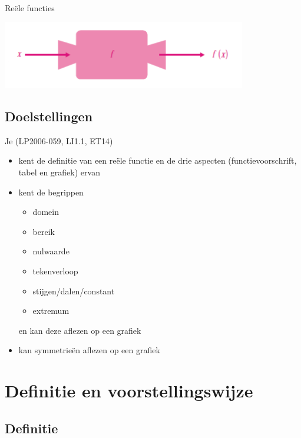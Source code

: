 \documentclass[12pt,a4paper,twoside]{article}
\begin{document}
\thispagestyle{empty}
\begin{center}
  \begin{mdframed}
  \centering
  \fontsize{40}{60}\selectfont Reële functies
  \end{mdframed}
  \vfill
  \includegraphics[width=0.8\textwidth]{FunctieMachine}
  \vfill
\end{center}

\subsection*{Doelstellingen}
\vspace*{-0.8cm}
{\singlespacing
Je \hfill  {\scriptsize(LP2006-059, LI1.1, ET14)}
\begin{itemize}
  \itemsep-0.2em
  \item kent de definitie van een reële functie en de drie aspecten (functievoorschrift, tabel en grafiek) ervan
  \item kent de begrippen
  \begin{itemize}
    \item domein
    \item bereik
    \item nulwaarde
    \item tekenverloop
    \item stijgen/dalen/constant
    \item extremum
  \end{itemize}
  en kan deze aflezen op een grafiek
  \item kan symmetrieën aflezen op een grafiek
\end{itemize}}

\newpage
\thispagestyle{empty}
\tableofcontents

\newpage
{}

\cleardoublepage
\section{Definitie en voorstellingswijze}

\subsection{Definitie}
\end{document}
